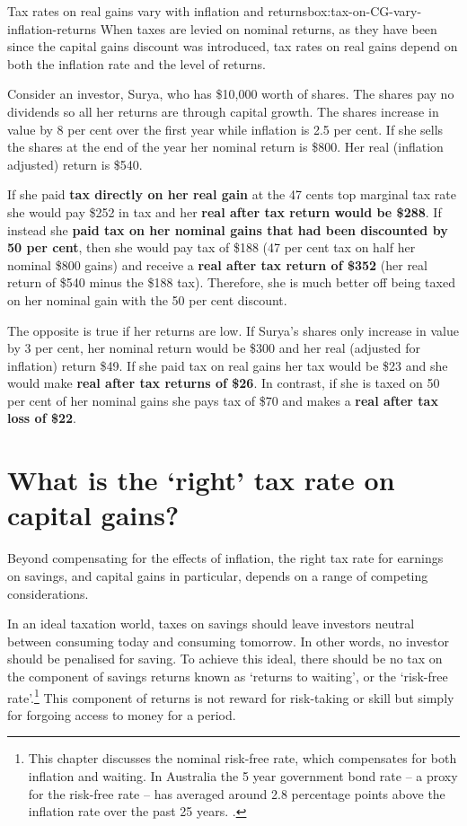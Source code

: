 \begin{smallbox}{Tax rates on real gains vary with inflation and returns}{box:tax-on-CG-vary-inflation-returns}
When taxes are levied on nominal returns, as they have been since the capital gains discount was introduced, tax rates on real gains depend on both the inflation rate and the level of returns. 

Consider an investor, Surya, who has \$10,000 worth of shares. The shares pay no dividends so all her returns are through capital growth. The shares increase in value by 8 per cent over the first year while inflation is 2.5 per cent. If she sells the shares at the end of the year her nominal return is \$800. Her real (inflation adjusted) return is \$540. 

If she paid \textbf{tax directly on her real gain} at the 47 cents top marginal tax rate she would pay \$252 in tax and her \textbf{real after tax return would be \$288}. If instead she \textbf{paid tax on her nominal gains that had been discounted by 50 per cent}, then she would pay tax of \$188 (47 per cent tax on half her nominal \$800 gains) and receive a \textbf{real after tax return of \$352} (her real return of \$540 minus the \$188 tax). Therefore, she is much better off being taxed on her nominal gain with the 50 per cent discount. 

The opposite is true if her returns are low. If Surya’s shares only increase in value by 3 per cent, her nominal return would be \$300 and her real (adjusted for inflation) return \$49. If she paid tax on real gains her tax would be \$23 and she would make \textbf{real after tax returns of \$26}. In contrast, if she is taxed on 50 per cent of her nominal gains she pays tax of \$70 and makes a \textbf{real after tax loss of \$22}.
\end{smallbox}



\section{What is the `right' tax rate on capital gains?}\label{sec:What-is-the-right-tax-rate-on-capital-gains}
Beyond compensating for the effects of inflation, the right tax rate for earnings on savings, and capital gains in particular, depends on a range of competing considerations. 

In an ideal taxation world, taxes on savings should leave investors neutral between consuming today and consuming tomorrow. In other words, no investor should be penalised for saving. To achieve this ideal, there should be no tax on the component of savings returns known as ‘returns to waiting’, or the ‘risk-free rate’.\footnote{This chapter discusses the nominal risk-free rate, which compensates for both inflation and waiting. In Australia the 5 year government bond rate – a proxy for the risk-free rate – has averaged around 2.8 percentage points above the inflation rate over the past 25 years. \textcite{RBA2015CapitalMarketYields}.} This component of returns is not reward for risk-taking or skill but simply for forgoing access to money for a period. 


